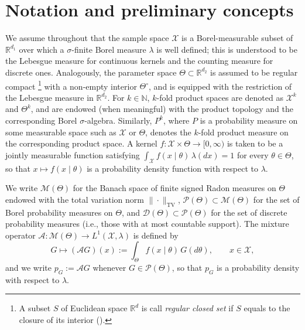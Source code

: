 \documentclass[11pt,twoside]{article} %
\begin{document}
\section{Notation and preliminary concepts}\label{sec:notation}

We assume throughout that the sample space $\mathcal X$ is a Borel-measurable subset of $\mathbb R^{d_1}$ over which a $\sigma$-finite Borel measure $\lambda$ is well defined; this is understood to be the Lebesgue measure for continuous kernels and the counting measure for discrete ones. Analogously, the parameter space $\Theta\subset\mathbb R^{d_2}$ is assumed to be regular compact \footnote{A subset $S$ of Euclidean space $\mathbb{R}^d$ is call \textit{regular closed set} if $S$ equals to the closure of its interior (\cite{willard1970general}). } with a non-empty interior $\Theta^\circ$, and is equipped with the restriction of  the Lebesgue measure in $\mathbb R^{d_2}$. For $k\in\mathbb N$, $k$-fold product spaces are denoted as $\mathcal X^k$ and $\Theta^k$, and are endowed (when meaningful) with the product topology and the corresponding Borel $\sigma$-algebra. Similarly, $P^k$, where $P$ is a probability measure on some measurable space such as $\mathcal X$ or $\Theta$, denotes the $k$-fold product measure on the corresponding product space. A kernel $f:\mathcal X\times\Theta\to[0,\infty)$ is taken to be a jointly measurable function satisfying $\int_{\mathcal X}f(x\mid\theta)\,\lambda(dx)=1$ for every $\theta\in\Theta$, so that $x\mapsto f(x\mid \theta)$ is a probability density function with respect to $\lambda$.

We write $\mathcal M(\Theta)$ for the Banach space of finite signed Radon measures on $\Theta$ endowed with the total variation norm $\|\cdot\|_{\mathrm{TV}}$,  $\mathcal P(\Theta)\subset\mathcal M(\Theta)$ for the set of Borel probability measures on $\Theta$, and $\mathcal D(\Theta)\subset \mathcal P(\Theta)$ for the set of discrete probability measures (i.e., those with at most countable support). The mixture operator $\mathcal A:\mathcal M(\Theta)\to L^1(\mathcal X,\lambda)$ is defined by
%
\begin{equation*}
 G \mapsto (\mathcal AG)(x):=\int_\Theta f(x\mid\theta)\,G(d\theta),\qquad x\in\mathcal X,
\end{equation*}
%
and we write $p_G:=\mathcal AG$ whenever $G\in\mathcal P(\Theta)$, so that $p_G$ is a probability density with respect to $\lambda$.
%
\end{document}

